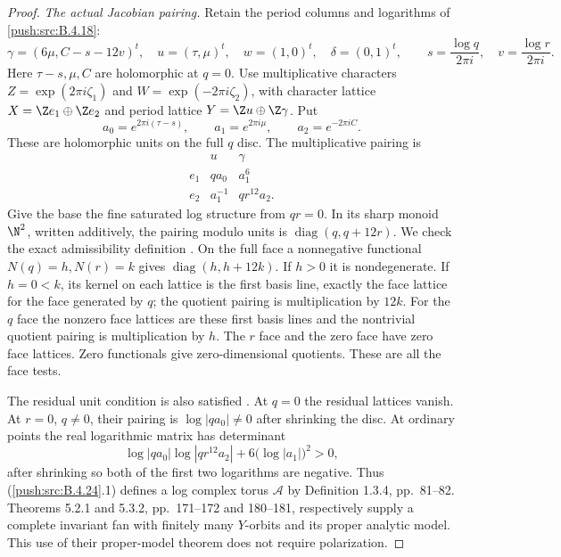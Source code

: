 \begin{proof}
\emph{The actual Jacobian pairing.}
Retain the period columns and logarithms of \ref{push:src:B.4.18}:
\[
 \gamma=(6\mu,C-s-12v)^t,\quad
 u=(\tau,\mu)^t,\quad w=(1,0)^t,\quad\delta=(0,1)^t,
 \qquad
 s=\frac{\log q}{2\pi i},\quad
 v=\frac{\log r}{2\pi i}.
\]
Here $\tau-s,\mu,C$ are holomorphic at $q=0$.
Use multiplicative characters
$Z=\exp(2\pi i\zeta_1)$ and
$W=\exp(-2\pi i\zeta_2)$, with character lattice
$X=\Z e_1\oplus\Z e_2$ and period lattice
$Y=\Z u\oplus\Z\gamma$. Put
\[
 a_0=e^{2\pi i(\tau-s)},\qquad
 a_1=e^{2\pi i\mu},\qquad a_2=e^{-2\pi iC}.
\]
These are holomorphic units on the full $q$ disc.
The multiplicative pairing is
\[
 \begin{array}{c|cc}
       &u&\gamma\\\hline
 e_1&q a_0&a_1^6\\
 e_2&a_1^{-1}&q r^{12}a_2.
 \end{array}
 \tag{B.4.24.1}
\]
Give the base the fine saturated log structure from
$qr=0$. In its sharp monoid $\N^2$, written additively,
the pairing modulo units is $\operatorname{diag}(q,q+12r)$.
We check the exact admissibility definition
\citep[Definition 1.2.3, pp.~77--78]{KKN2008Root}.
On the full face a nonnegative functional
$N(q)=h,N(r)=k$ gives
$\operatorname{diag}(h,h+12k)$. If $h>0$ it is
nondegenerate. If $h=0<k$, its kernel on each lattice
is the first basis line, exactly the face lattice
for the face generated by $q$; the quotient pairing
is multiplication by $12k$. For the $q$ face the
nonzero face lattices are these first basis lines
and the nontrivial quotient pairing is multiplication
by $h$. The $r$ face and the zero face have zero
face lattices. Zero functionals give zero-dimensional
quotients. These are all the face tests.

The residual unit condition is also satisfied
\citep[Definition 1.2.6, p.~79]{KKN2008Root}.
At $q=0$ the residual lattices vanish. At $r=0$,
$q\ne0$, their pairing is $\log|q a_0|\ne0$ after
shrinking the disc. At ordinary points the real
logarithmic matrix has determinant
\[
 \log|q a_0|\log|q r^{12}a_2|
                 +6\bigl(\log|a_1|\bigr)^2>0,
\]
after shrinking so both of the first two logarithms
are negative. Thus (\ref{push:src:B.4.24}.1) defines a log complex
torus $\mathcal A$ by Definition 1.3.4, pp.~81--82.
Theorems 5.2.1 and 5.3.2, pp.~171--172 and 180--181,
respectively supply a complete invariant fan with
finitely many $Y$-orbits and its proper analytic
model. This use of their proper-model theorem does
not require polarization.


\end{proof}
